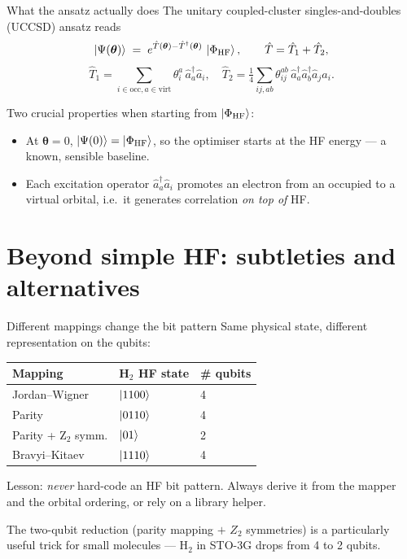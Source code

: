 \documentclass[10pt,aspectratio=169]{beamer}
\begin{document}
\begin{frame}{What the ansatz actually does}
The unitary coupled-cluster singles-and-doubles (UCCSD) ansatz reads
\[
\ket{\Psi(\bm\theta)} \;=\; e^{\hat T(\bm\theta) - \hat T^{\dagger}(\bm\theta)} \,\ket{\Phi_{\text{HF}}},
\qquad
\hat T = \hat T_1 + \hat T_2,
\]
\[
\hat T_1 = \sum_{i\in\text{occ}, a\in\text{virt}} \theta_i^{a}\, \hat a^{\dagger}_a \hat a_i,
\quad
\hat T_2 = \tfrac14 \sum_{ij,ab} \theta_{ij}^{ab}\, \hat a^{\dagger}_a \hat a^{\dagger}_b \hat a_j \hat a_i.
\]

Two crucial properties when starting from $\ket{\Phi_{\text{HF}}}$:
\begin{itemize}
  \item At $\bm\theta = 0$, $\ket{\Psi(0)} = \ket{\Phi_{\text{HF}}}$, so the optimiser starts at the HF energy — a known, sensible baseline.
  \item Each excitation operator $\hat a^{\dagger}_a \hat a_i$ promotes an electron from an occupied to a virtual orbital, i.e.\ it generates correlation \emph{on top of} HF.
\end{itemize}
\end{frame}

\section{Beyond simple HF: subtleties and alternatives}

\begin{frame}{Different mappings change the bit pattern}
Same physical state, different representation on the qubits:
\begin{center}
\begin{tabular}{lll}
\hline
Mapping & H$_2$ HF state & \# qubits \\
\hline
Jordan--Wigner       & $\ket{1100}$        & 4 \\
Parity               & $\ket{0110}$        & 4 \\
Parity + Z$_2$ symm. & $\ket{01}$          & 2 \\
Bravyi--Kitaev       & $\ket{1110}$        & 4 \\
\hline
\end{tabular}
\end{center}
\smallskip
Lesson: \emph{never} hard-code an HF bit pattern. Always derive it from the mapper and the orbital ordering, or rely on a library helper.

\smallskip
The two-qubit reduction (parity mapping $+$ $Z_2$ symmetries) is a particularly useful trick for small molecules — H$_2$ in STO-3G drops from 4 to 2 qubits.
\end{frame}
\end{document}
